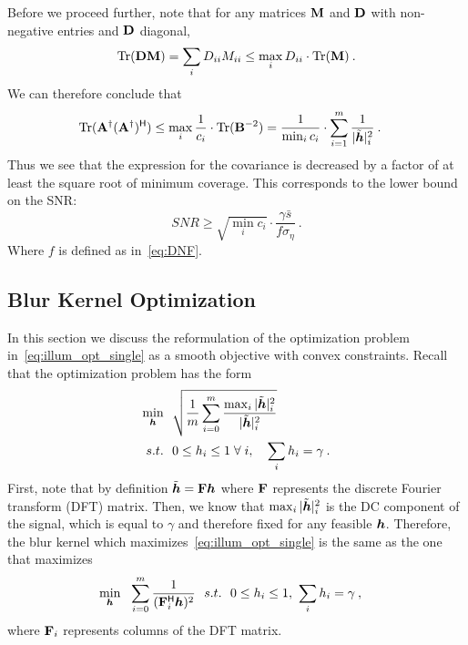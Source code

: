 Before we proceed further, note that for any matrices $\mathbf{M}$ and $\mathbf{D}$ with non-negative entries and $\mathbf{D}$ diagonal,
\[\mathrm{Tr}(\mathbf{D}\mathbf{M}) = \sum_{i} D_{ii} M_{ii}  \leq \max_{i} D_{ii} \cdot \mathrm{Tr}(\mathbf{M})\:.\]
We can therefore conclude that
\begin{align*}
    \mathrm{Tr}(\mathbf{A}^\dagger (\mathbf{A}^\dagger)^{\mathsf{H}})&\leq \max_{i}\frac{1}{c_i}\cdot \mathrm{Tr}(\mathbf{B}^{-2})
    =
    \frac{1}{\min_{i} c_i}   \cdot \sum_{i=1}^m \frac{1}{|\tilde {\bm{h}}|_i^2}\:.
\end{align*}
Thus we see that the expression for the covariance is decreased by a factor of at least the square root of minimum coverage. This corresponds to the lower bound on the SNR:
\[SNR \geq \sqrt{{\min_{i} c_i}}\cdot \frac{ \gamma\bar s}{ f \sigma_\eta  }\:.\]
Where $f$ is defined as in~\eqref{eq:DNF}.



\subsection{Blur Kernel Optimization} \label{sec:appendix:optimization_app}

In this section we discuss the reformulation of
the optimization problem in~\eqref{eq:illum_opt_single} as a smooth objective with convex constraints.
Recall that the optimization problem has the form
\begin{align*}
\min_{\bm{h}}&~~ \sqrt{\frac{1}{m} \sum_{i=0}^m \frac{\max_i{|\tilde{\bm{h}}|_i^2}}{|\tilde{\bm{h}}|_i^2}} \\
  s.t. &~~0 \leq h_i \leq 1 \; \forall \; i, \quad
  \sum_{i} h_i = \gamma \:.
\end{align*}
First, note that by definition $\tilde {\bm{h}}=\mathbf{F}\bm{h}$ where $\mathbf{F}$ represents the discrete Fourier transform (DFT) matrix.
Then, we know that $\max_i{|\tilde{\bm{h}}|_i^2}$ is the DC component of the signal, which is equal to $\gamma$ and therefore fixed for any feasible $\bm{h}$.
Therefore, the blur kernel which maximizes~\eqref{eq:illum_opt_single} is the same as the one that maximizes
\begin{align*}
\label{eq:opt_smooth}
\min_{\bm{h}}&~~ \sum_{i=0}^m \frac{1}{(\mathbf{F}_i^{\mathsf{H}}\bm{h})^2} ~~
  s.t. ~~0 \leq h_i \leq 1, ~
  \sum_{i} h_i = \gamma \:,
\end{align*}
where $\mathbf{F}_i$ represents columns of the DFT matrix.

